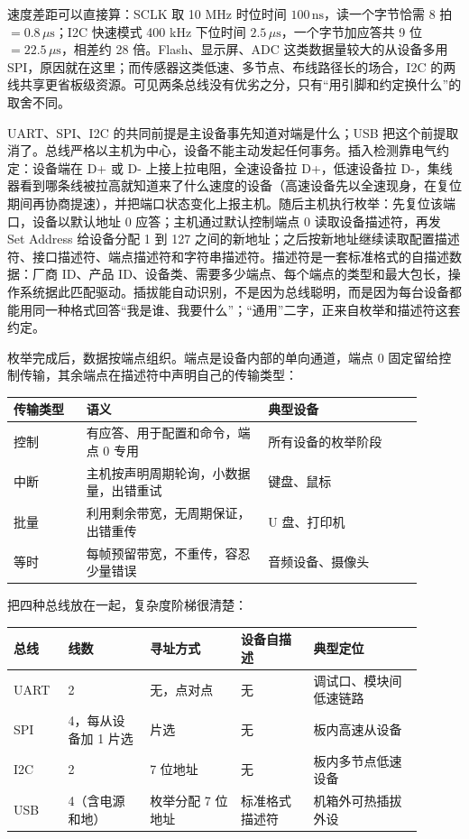 速度差距可以直接算：SCLK 取 10 MHz 时位时间 $100\,\text{ns}$，读一个字节恰需 8 拍 $=0.8\,\mu\text{s}$；I2C 快速模式 400 kHz 下位时间 $2.5\,\mu\text{s}$，一个字节加应答共 9 位 $=22.5\,\mu\text{s}$，相差约 28 倍。Flash、显示屏、ADC 这类数据量较大的从设备多用 SPI，原因就在这里；而传感器这类低速、多节点、布线路径长的场合，I2C 的两线共享更省板级资源。可见两条总线没有优劣之分，只有“用引脚和约定换什么”的取舍不同。

UART、SPI、I2C 的共同前提是主设备事先知道对端是什么；USB 把这个前提取消了。总线严格以主机为中心，设备不能主动发起任何事务。插入检测靠电气约定：设备端在 D+ 或 D- 上接上拉电阻，全速设备拉 D+，低速设备拉 D-，集线器看到哪条线被拉高就知道来了什么速度的设备（高速设备先以全速现身，在复位期间再协商提速），并把端口状态变化上报主机。随后主机执行枚举：先复位该端口，设备以默认地址 0 应答；主机通过默认控制端点 0 读取设备描述符，再发 Set Address 给设备分配 1 到 127 之间的新地址；之后按新地址继续读取配置描述符、接口描述符、端点描述符和字符串描述符。描述符是一套标准格式的自描述数据：厂商 ID、产品 ID、设备类、需要多少端点、每个端点的类型和最大包长，操作系统据此匹配驱动。插拔能自动识别，不是因为总线聪明，而是因为每台设备都能用同一种格式回答“我是谁、我要什么”；“通用”二字，正来自枚举和描述符这套约定。

枚举完成后，数据按端点组织。端点是设备内部的单向通道，端点 0 固定留给控制传输，其余端点在描述符中声明自己的传输类型：

\begin{longtable}{L{0.16\linewidth}L{0.40\linewidth}L{0.34\linewidth}}
\toprule
传输类型 & 语义 & 典型设备 \\
\midrule
控制 & 有应答、用于配置和命令，端点 0 专用 & 所有设备的枚举阶段 \\\tablerowrule
中断 & 主机按声明周期轮询，小数据量，出错重试 & 键盘、鼠标 \\\tablerowrule
批量 & 利用剩余带宽，无周期保证，出错重传 & U 盘、打印机 \\\tablerowrule
等时 & 每帧预留带宽，不重传，容忍少量错误 & 音频设备、摄像头 \\
\bottomrule
\end{longtable}

把四种总线放在一起，复杂度阶梯很清楚：

\begin{longtable}{L{0.12\linewidth}L{0.18\linewidth}L{0.20\linewidth}L{0.16\linewidth}L{0.24\linewidth}}
\toprule
总线 & 线数 & 寻址方式 & 设备自描述 & 典型定位 \\
\midrule
UART & 2 & 无，点对点 & 无 & 调试口、模块间低速链路 \\\tablerowrule
SPI & 4，每从设备加 1 片选 & 片选 & 无 & 板内高速从设备 \\\tablerowrule
I2C & 2 & 7 位地址 & 无 & 板内多节点低速设备 \\\tablerowrule
USB & 4（含电源和地） & 枚举分配 7 位地址 & 标准格式描述符 & 机箱外可热插拔外设 \\
\bottomrule
\end{longtable}

